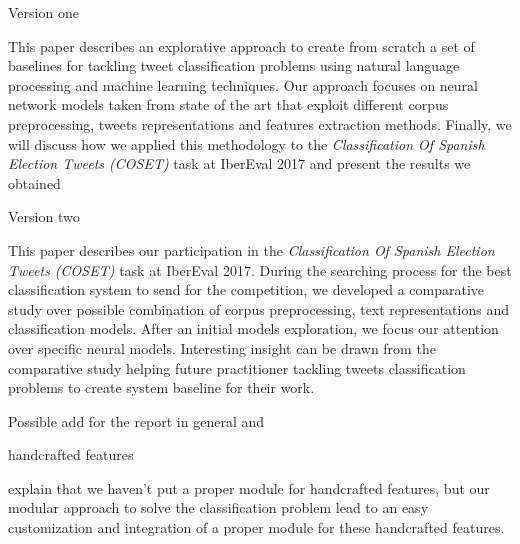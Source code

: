 \abstract

Version one

This paper describes an explorative approach to create from scratch a set of baselines for tackling tweet classification problems using natural language processing and machine learning techniques.
Our approach focuses on neural network models taken from state of the art that exploit different corpus preprocessing, tweets representations and features extraction methods.
Finally, we will discuss how we applied this methodology to the \emph{Classification Of Spanish Election Tweets (COSET)} task at IberEval 2017 and present the results we obtained

Version two

This paper describes our participation in the \emph{Classification Of Spanish Election Tweets (COSET)} task at IberEval 2017.
During the searching process for the best classification system to send for the competition, we developed a comparative study over possible combination of corpus preprocessing, text representations and classification models. After an initial models exploration, we focus our attention over specific neural models.
Interesting insight can be drawn from the comparative study helping future practitioner tackling tweets classification problems to create system baseline for their work.

Possible add for the report in general and 

handcrafted features

explain that we haven't put a proper module for handcrafted features, but our modular approach to solve the classification problem lead to an easy customization and integration of a proper module for these handcrafted features.